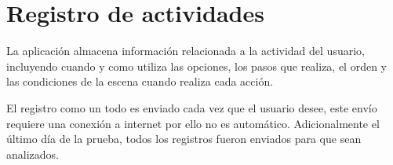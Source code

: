 \section{Registro de actividades}

La aplicación almacena información relacionada a la actividad del usuario,
incluyendo cuando y como utiliza las opciones, los pasos que realiza, el orden y
las condiciones de la escena cuando realiza cada acción.

El registro como un todo es enviado cada vez que el usuario desee, este envío
requiere una conexión a internet por ello no es automático. Adicionalmente el
último día de la prueba, todos los registros fueron enviados para que sean
analizados.


